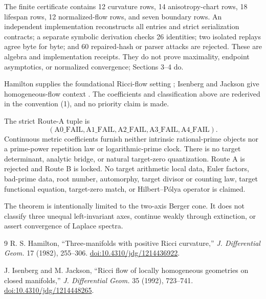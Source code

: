 \documentclass[10pt]{article}
\theoremstyle{remark}
\begin{document}
The finite certificate contains 12 curvature rows, 14 anisotropy-chart rows,
18 lifespan rows, 12 normalized-flow rows, and seven boundary rows.  An
independent implementation reconstructs all entries and strict serialization
contracts; a separate symbolic derivation checks 26 identities; two isolated
replays agree byte for byte; and 60 repaired-hash or parser attacks are
rejected.  These are algebra and implementation receipts.  They do not prove
maximality, endpoint asymptotics, or normalized convergence; Sections 3--4 do.

Hamilton supplies the foundational Ricci-flow setting \cite{hamilton};
Isenberg and Jackson give homogeneous-flow context \cite{isenbergjackson}.
The coefficients and classification above are rederived in the convention
(1), and no priority claim is made.

The strict Route-A tuple is
\[
 (\mathrm{A0\_FAIL},\mathrm{A1\_FAIL},\mathrm{A2\_FAIL},
  \mathrm{A3\_FAIL},\mathrm{A4\_FAIL}).
\]
Continuous metric coefficients furnish neither intrinsic rational-prime
objects nor a prime-power repetition law or logarithmic-prime clock.  There
is no target determinant, analytic bridge, or natural target-zero
quantization.  Route A is rejected and Route B is locked.  No target
arithmetic local data, Euler factors, bad-prime data, root number, automorphy,
target divisor or counting law, target functional equation, target-zero
match, or Hilbert--P\'olya operator is claimed.

The theorem is intentionally limited to the two-axis Berger cone.  It does
not classify three unequal left-invariant axes, continue weakly through
extinction, or assert convergence of Laplace spectra.

\begin{thebibliography}{9}
R. S. Hamilton,
``Three-manifolds with positive Ricci curvature,''
\emph{J. Differential Geom.} 17 (1982), 255--306.
\href{https://doi.org/10.4310/jdg/1214436922}{doi:10.4310/jdg/1214436922}.

J. Isenberg and M. Jackson,
``Ricci flow of locally homogeneous geometries on closed manifolds,''
\emph{J. Differential Geom.} 35 (1992), 723--741.
\href{https://doi.org/10.4310/jdg/1214448265}{doi:10.4310/jdg/1214448265}.
\end{thebibliography}
\fi
\end{document}
